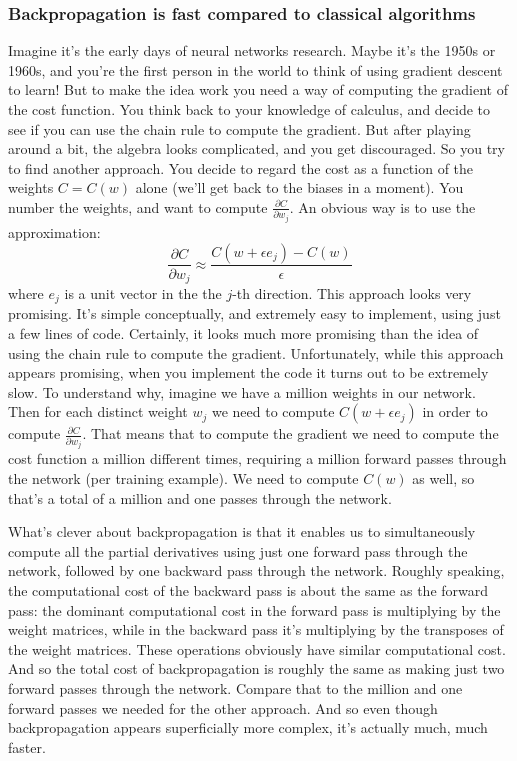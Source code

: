 \subsubsection{Backpropagation is fast compared to classical algorithms}
Imagine it's the early days of neural networks research. Maybe it's the 1950s or 1960s, and you're the first person in the world to think of using gradient descent to learn! But to make the idea work you need a way of computing the gradient of the cost function. You think back to your knowledge of calculus, and decide to see if you can use the chain rule to compute the gradient. But after playing around a bit, the algebra looks complicated, and you get discouraged. So you try to find another approach. You decide to regard the cost as a function of the weights $C=C(w)$ alone (we'll get back to the biases in a moment). You number the weights, and want to compute $\frac{\partial C}{\partial w_j}$. An obvious way is to use the approximation:
\begin{equation*}
\frac{\partial C}{\partial w_j} \approx \frac{C(w+\epsilon e_j) - C(w)}{\epsilon}
\end{equation*}
where $e_j$ is a unit vector in the the $j$-th direction. This approach looks very promising. It's simple conceptually, and extremely easy to implement, using just a few lines of code. Certainly, it looks much more promising than the idea of using the chain rule to compute the gradient. Unfortunately, while this approach appears promising, when you implement the code it turns out to be extremely slow. To understand why, imagine we have a million weights in our network. Then for each distinct weight $w_j$ we need to compute $C(w+\epsilon e_j)$ in order to compute $\frac{\partial C}{\partial w_j}$. That means that to compute the gradient we need to compute the cost function a million different times, requiring a million forward passes through the network (per training example). We need to compute $C(w)$ as well, so that's a total of a million and one passes through the network.

What's clever about backpropagation is that it enables us to simultaneously compute all the partial derivatives using just one forward pass through the network, followed by one backward pass through the network. Roughly speaking, the computational cost of the backward pass is about the same as the forward pass: the dominant computational cost in the forward pass is multiplying by the weight matrices, while in the backward pass it's multiplying by the transposes of the weight matrices. These operations obviously have similar computational cost. And so the total cost of backpropagation is roughly the same as making just two forward passes through the network. Compare that to the million and one forward passes we needed for the other approach. And so even though backpropagation appears superficially more complex, it's actually much, much faster.

